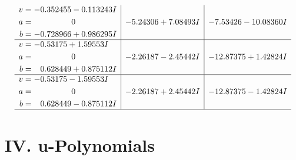 \documentclass[1p]{elsarticle_modified}
\theoremstyle{definition}
\begin{document}
$$\begin{array}{c|c|c}
\begin{aligned}
v &= -0.352455 - 0.113243 I \\
a &= \phantom{-0.000000 } 0 \\
b &= -0.728966 + 0.986295 I\end{aligned}
 & -5.24306 + 7.08493 I & -7.53426 - 10.08360 I \\ \hline\begin{aligned}
v &= -0.53175 + 1.59553 I \\
a &= \phantom{-0.000000 } 0 \\
b &= \phantom{-}0.628449 + 0.875112 I\end{aligned}
 & -2.26187 - 2.45442 I & -12.87375 + 1.42824 I \\ \hline\begin{aligned}
v &= -0.53175 - 1.59553 I \\
a &= \phantom{-0.000000 } 0 \\
b &= \phantom{-}0.628449 - 0.875112 I\end{aligned}
 & -2.26187 + 2.45442 I & -12.87375 - 1.42824 I\\
 \hline 
 \end{array}$$\newpage
\newpage\renewcommand{\arraystretch}{1}
\centering \section*{ IV. u-Polynomials}
\end{document}
